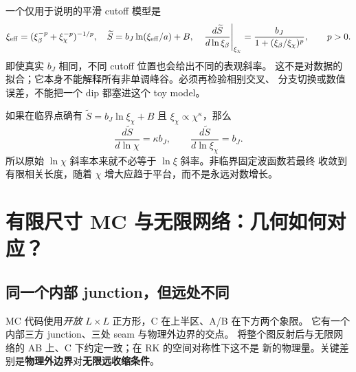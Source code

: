 \documentclass[11pt]{article}
\newcommand{\tS}{\widetilde S}
\newcommand{\xb}{\xi_\beta}
\newcommand{\xc}{\xi_\chi}
\begin{document}
一个仅用于说明的平滑 cutoff 模型是
\begin{equation}
 \xi_{\rm eff}=(\xb^{-p}+\xc^{-p})^{-1/p},\quad
 \tS=b_J\ln(\xi_{\rm eff}/a)+B,\quad
 \left.\frac{d\tS}{d\ln\xb}\right|_{\xc}
 =\frac{b_J}{1+(\xb/\xc)^p},\qquad p>0.\label{eq:toy}
\end{equation}
即使真实 $b_J$ 相同，不同 cutoff 位置也会给出不同的表观斜率。
这不是对数据的拟合；它本身不能解释所有非单调峰谷。必须再检验相别交叉、
分支切换或数值误差，不能把一个 dip 都塞进这个 toy model。

如果在临界点确有 $\tS=b_J\ln\xc+B$ 且 $\xc\propto\chi^\kappa$，那么
\begin{equation}
 \frac{d\tS}{d\ln\chi}=\kappa b_J,
 \qquad \frac{d\tS}{d\ln\xc}=b_J.
\end{equation}
所以原始 $\ln\chi$ 斜率本来就不必等于 $\ln\xi$ 斜率。非临界固定波函数若最终
收敛到有限相关长度，随着 $\chi$ 增大应趋于平台，而不是永远对数增长。

\section{有限尺寸 MC 与无限网络：几何如何对应？}
\subsection{同一个内部 junction，但远处不同}
MC 代码使用\emph{开放} $L\times L$ 正方形，C 在上半区、A/B 在下方两个象限。
它有一个内部三方 junction、三处 seam 与物理外边界的交点。
将整个图反射后与无限网络的 AB 上、C 下约定一致；在 RK 的空间对称性下这不是
新的物理量。关键差别是\textbf{物理外边界}对\textbf{无限远收缩条件}。
\end{document}
